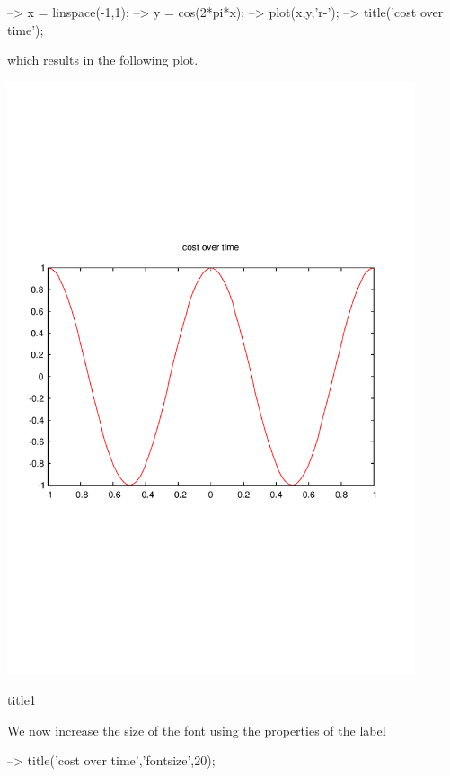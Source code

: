 \begin{DoxyVerbInclude}
--> x = linspace(-1,1);
--> y = cos(2*pi*x);
--> plot(x,y,'r-');
--> title('cost over time');
\end{DoxyVerbInclude}


which results in the following plot.  
\begin{DoxyImage}
\includegraphics[width=12cm]{title1}
\caption{title1}
\end{DoxyImage}
 We now increase the size of the font using the properties of the {\ttfamily label}


\begin{DoxyVerbInclude}
--> title('cost over time','fontsize',20);
\end{DoxyVerbInclude}


